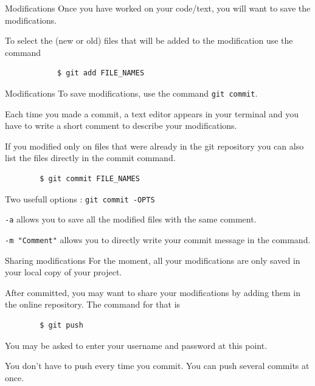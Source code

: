 \documentclass{beamer}
\begin{document}
	\begin{frame}[fragile]{Modifications}
		Once you have worked on your code/text, you will want to save the modifications. \newline
		
		To select the (new or old) files that will be added to the modification use the command
		\begin{verbatim}
			$ git add FILE_NAMES
		\end{verbatim}
	\end{frame}

	\begin{frame}[fragile]{Modifications}	
		To save modifications, use the command \texttt{git commit}. \newline 
		
		Each time you made a commit, a text editor appears in your terminal and you have to write a short comment to describe your modifications. \newline
		
		If you modified only on files that were already in the git repository you can also list the files directly in the commit command. 
		\begin{verbatim}
		$ git commit FILE_NAMES
		\end{verbatim}
		
		Two usefull options : \texttt{git commit -OPTS}
		
		\texttt{-a} allows you to save all the modified files with the same comment.
		 
		\texttt{-m "Comment"} allows you to directly write your commit message in the command. 		
	\end{frame}

	\begin{frame}[fragile]{Sharing modifications}
		For the moment, all your modifications are only saved in your local copy of your project. 
		
		After committed, you may want to share your modifications by adding them in the online repository. The command for that is 
		
		\begin{verbatim}
		$ git push
		\end{verbatim}
		
		You may be asked to enter your username and password at this point.
		
		You don't have to push every time you commit. You can push several commits at once. 
	\end{frame}
	
\end{document}
